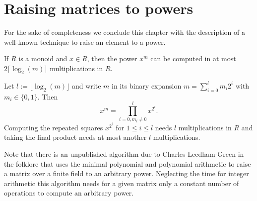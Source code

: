 \section{Raising matrices to powers}

For the sake of completeness we conclude this chapter with the description
of a well-known technique to raise an element to a power.

\begin{Lemm}[Powering up]
If $R$ is a monoid and $x \in R$, then the power $x^m$ can be computed
in at most $2\lceil\log_2(m)\rceil$ multiplications in $R$.
\end{Lemm}
\proofbeg
Let $l := \lfloor\log_2(m)\rfloor$ and write $m$ in its binary expansion 
$m = \sum_{i=0}^l m_i 2^i$ with $m_i \in \{0,1\}$. Then
\[ x^m = \prod_{i=0, m_i \neq 0}^l x^{2^i}. \]
Computing the repeated squares $x^{2^i}$ for $1 \le i \le l$ needs $l$
multiplications in $R$ and taking the final product needs at most
another $l$ multiplications.
\proofend

\begin{Rem}
Note that there is an unpublished algorithm due to Charles Leedham-Green
in the folklore that uses the minimal polynomial and polynomial arithmetic
to raise a matrix over a finite field to an arbitrary power. Neglecting 
the time for integer arithmetic this algorithm needs for a given matrix
only a constant number of operations to compute an arbitrary power.
\end{Rem}

